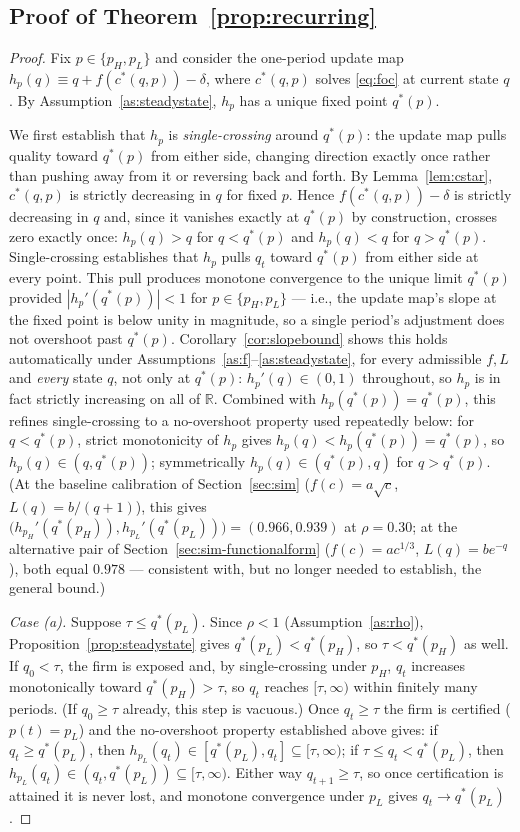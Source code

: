 \subsection{Proof of Theorem~\ref{prop:recurring}}
\begin{proof}
Fix $p \in \{p_H, p_L\}$ and consider the one-period update map $h_p(q) \equiv q + f(c^*(q,p)) - \delta$, where $c^*(q,p)$ solves \eqref{eq:foc} at current state $q$. By Assumption~\ref{as:steadystate}, $h_p$ has a unique fixed point $q^*(p)$.

We first establish that $h_p$ is \emph{single-crossing} around $q^*(p)$: the update map pulls quality toward $q^*(p)$ from either side, changing direction exactly once rather than pushing away from it or reversing back and forth. By Lemma~\ref{lem:cstar}, $c^*(q,p)$ is strictly decreasing in $q$ for fixed $p$. Hence $f(c^*(q,p)) - \delta$ is strictly decreasing in $q$ and, since it vanishes exactly at $q^*(p)$ by construction, crosses zero exactly once: $h_p(q) > q$ for $q < q^*(p)$ and $h_p(q) < q$ for $q > q^*(p)$. Single-crossing establishes that $h_p$ pulls $q_t$ toward $q^*(p)$ from either side at every point. This pull produces monotone convergence to the unique limit $q^*(p)$ provided $|h_p'(q^*(p))| < 1$ for $p \in \{p_H, p_L\}$ — i.e., the update map's slope at the fixed point is below unity in magnitude, so a single period's adjustment does not overshoot past $q^*(p)$. Corollary~\ref{cor:slopebound} shows this holds automatically under Assumptions~\ref{as:f}--\ref{as:steadystate}, for every admissible $f,L$ and \emph{every} state $q$, not only at $q^*(p)$: $h_p'(q)\in(0,1)$ throughout, so $h_p$ is in fact strictly increasing on all of $\mathbb{R}$. Combined with $h_p(q^*(p))=q^*(p)$, this refines single-crossing to a no-overshoot property used repeatedly below: for $q<q^*(p)$, strict monotonicity of $h_p$ gives $h_p(q)<h_p(q^*(p))=q^*(p)$, so $h_p(q)\in(q,q^*(p))$; symmetrically $h_p(q)\in(q^*(p),q)$ for $q>q^*(p)$. (At the baseline calibration of Section~\ref{sec:sim} ($f(c)=a\sqrt{c}$, $L(q)=b/(q+1)$), this gives $\big(h_{p_H}'(q^*(p_H)), h_{p_L}'(q^*(p_L))\big) = (0.966, 0.939)$ at $\rho=0.30$; at the alternative pair of Section~\ref{sec:sim-functionalform} ($f(c)=ac^{1/3}$, $L(q)=be^{-q}$), both equal $0.978$ — consistent with, but no longer needed to establish, the general bound.)

\emph{Case (a).} Suppose $\tau \leq q^*(p_L)$. Since $\rho<1$ (Assumption~\ref{as:rho}), Proposition~\ref{prop:steadystate} gives $q^*(p_L) < q^*(p_H)$, so $\tau<q^*(p_H)$ as well. If $q_0<\tau$, the firm is exposed and, by single-crossing under $p_H$, $q_t$ increases monotonically toward $q^*(p_H)>\tau$, so $q_t$ reaches $[\tau,\infty)$ within finitely many periods. (If $q_0\geq\tau$ already, this step is vacuous.) Once $q_t\geq\tau$ the firm is certified ($p(t)=p_L$) and the no-overshoot property established above gives: if $q_t\geq q^*(p_L)$, then $h_{p_L}(q_t)\in[q^*(p_L),q_t]\subseteq[\tau,\infty)$; if $\tau\leq q_t<q^*(p_L)$, then $h_{p_L}(q_t)\in(q_t,q^*(p_L))\subseteq[\tau,\infty)$. Either way $q_{t+1}\geq\tau$, so once certification is attained it is never lost, and monotone convergence under $p_L$ gives $q_t\to q^*(p_L)$.


\end{proof}
